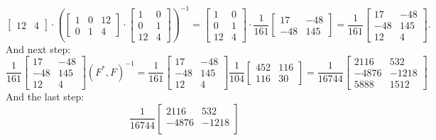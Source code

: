\documentclass[12pt]{report}
\begin{document}
\begin{solution}
\[\begin{bmatrix}
         12 & 4 
      \end{bmatrix} \cdot \left(\begin{bmatrix}
         1 & 0 & 12\\
         0 & 1 & 4
      \end{bmatrix} \cdot \begin{bmatrix}
         1 & 0 \\
         0 & 1\\
         12 & 4 
      \end{bmatrix}\right)^{-1} = \begin{bmatrix}
         1 & 0 \\
         0 & 1\\
         12 & 4 
      \end{bmatrix} \cdot \dfrac{1}{161}\begin{bmatrix}
         17 & -48 \\
         -48 & 145
      \end{bmatrix} = \dfrac{1}{161} \begin{bmatrix}
         17 & -48 \\
         -48 & 145 \\
         12 & 4
      \end{bmatrix}.
   \]
   And next step:
   \[
      \dfrac{1}{161} \begin{bmatrix}
         17 & -48 \\
         -48 & 145 \\
         12 & 4
      \end{bmatrix} \left(F^*, F\right)^{-1} = \dfrac{1}{161} \begin{bmatrix}
         17 & -48 \\
         -48 & 145 \\
         12 & 4
      \end{bmatrix} \dfrac{1}{104} \begin{bmatrix}
         452 & 116 \\
         116 & 30
      \end{bmatrix} = \dfrac{1}{16744} \begin{bmatrix}
         2116 & 532\\
         -4876 & -1218\\
         5888 & 1512
      \end{bmatrix}
   \]
   And the last step:
   \[
      \dfrac{1}{16744} \begin{bmatrix}
         2116 & 532\\
         -4876 & -1218\\

\end{bmatrix}\]
\end{solution}
\end{document}
